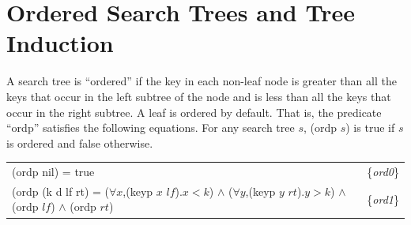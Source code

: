 \section{Ordered Search Trees and Tree Induction}

A search tree is ``ordered'' if the key in each non-leaf node is
greater than all the keys that occur in the left subtree of the node
and is less than all the keys that occur in the right subtree. A
leaf is ordered by default. That is, the predicate 
``ordp'' satisfies the following equations.
For any search tree $s$, (ordp $s$) is true if $s$ is ordered 
and false otherwise.

\begin{center}
\begin{tabular}{ll}
(ordp nil) = true  & \{\emph{ord0}\} \\
(ordp (k d lf rt) = ($\forall x$,(keyp $x$ $lf$).$x < k$) $\wedge$
                    ($\forall y$,(keyp $y$ $rt$).$y > k$) $\wedge$
                    (ordp $lf$) $\wedge$  (ordp $rt$) & \{\emph{ord1}\} \\
\end{tabular}
\end{center}


